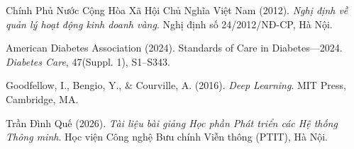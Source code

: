 \documentclass[12pt,a4paper]{report}
\begin{document}
\begin{enumerate}[leftmargin=1.5cm, label={[\arabic*]}]
    \item Chính Phủ Nước Cộng Hòa Xã Hội Chủ Nghĩa Việt Nam (2012). \textit{Nghị định về quản lý hoạt động kinh doanh vàng}. Nghị định số 24/2012/NĐ-CP, Hà Nội.
    \item American Diabetes Association (2024). Standards of Care in Diabetes—2024. \textit{Diabetes Care}, 47(Suppl. 1), S1--S343.
    \item Goodfellow, I., Bengio, Y., \& Courville, A. (2016). \textit{Deep Learning}. MIT Press, Cambridge, MA.
    \item Trần Đình Quế (2026). \textit{Tài liệu bài giảng Học phần Phát triển các Hệ thống Thông minh}. Học viện Công nghệ Bưu chính Viễn thông (PTIT), Hà Nội.
\end{enumerate}
\end{document}
